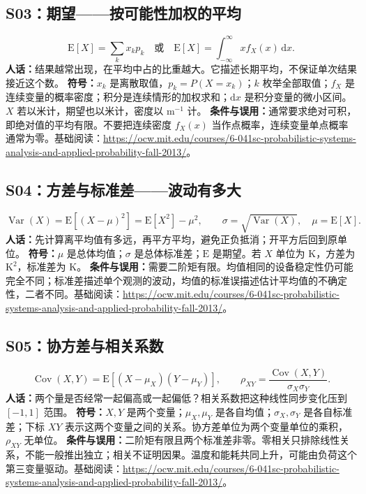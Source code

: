\subsection{S03：期望——按可能性加权的平均}
\begin{equation}
 \mathrm{E}[X]=\sum_k x_kp_k\quad\text{或}\quad
 \mathrm{E}[X]=\int_{-\infty}^{\infty}x f_X(x)\,\mathrm{d}x.
\end{equation}
\textbf{人话：}结果越常出现，在平均中占的比重越大。它描述长期平均，不保证单次结果接近这个数。
\textbf{符号：}$x_k$ 是离散取值，$p_k=P(X=x_k)$；$k$ 枚举全部取值；$f_X$ 是连续变量的概率密度；积分是连续情形的加权求和；$\mathrm{d}x$ 是积分变量的微小区间。$X$ 若以米计，期望也以米计，密度以 $\mathrm{m}^{-1}$ 计。
\textbf{条件与误用：}通常要求绝对可积，即绝对值的平均有限。不要把连续密度 $f_X(x)$ 当作点概率，连续变量单点概率通常为零。基础阅读：\url{https://ocw.mit.edu/courses/6-041sc-probabilistic-systems-analysis-and-applied-probability-fall-2013/}。

\subsection{S04：方差与标准差——波动有多大}
\begin{equation}
 \operatorname{Var}(X)=\mathrm{E}[(X-\mu)^2]=\mathrm{E}[X^2]-\mu^2,
 \qquad \sigma=\sqrt{\operatorname{Var}(X)},\quad \mu=\mathrm{E}[X].
\end{equation}
\textbf{人话：}先计算离平均值有多远，再平方平均，避免正负抵消；开平方后回到原单位。
\textbf{符号：}$\mu$ 是总体均值；$\sigma$ 是总体标准差；$\mathrm{E}$ 是期望。若 $X$ 单位为 K，方差为 $\mathrm{K}^2$，标准差为 K。
\textbf{条件与误用：}需要二阶矩有限。均值相同的设备稳定性仍可能完全不同；标准差描述单个观测的波动，均值的标准误描述估计平均值的不确定性，二者不同。基础阅读：\url{https://ocw.mit.edu/courses/6-041sc-probabilistic-systems-analysis-and-applied-probability-fall-2013/}。

\subsection{S05：协方差与相关系数}
\begin{equation}
 \operatorname{Cov}(X,Y)=\mathrm{E}[(X-\mu_X)(Y-\mu_Y)],\qquad
 \rho_{XY}=\frac{\operatorname{Cov}(X,Y)}{\sigma_X\sigma_Y}.
\end{equation}
\textbf{人话：}两个量是否经常一起偏高或一起偏低？相关系数把这种线性同步变化压到 $[-1,1]$ 范围。
\textbf{符号：}$X,Y$ 是两个变量；$\mu_X,\mu_Y$ 是各自均值；$\sigma_X,\sigma_Y$ 是各自标准差；下标 $XY$ 表示这两个变量之间的关系。协方差单位为两个变量单位的乘积，$\rho_{XY}$ 无单位。
\textbf{条件与误用：}二阶矩有限且两个标准差非零。零相关只排除线性关系，不能一般推出独立；相关不证明因果。温度和能耗共同上升，可能由负荷这个第三变量驱动。基础阅读：\url{https://ocw.mit.edu/courses/6-041sc-probabilistic-systems-analysis-and-applied-probability-fall-2013/}。

